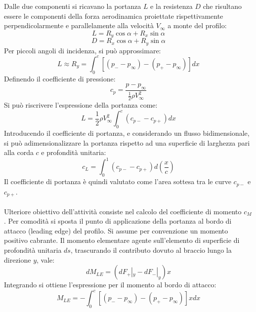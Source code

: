 Dalle due componenti si ricavano la portanza $L$ e la resistenza $D$ che risultano essere le componenti della forza aerodinamica proiettate rispettivamente perpendicolarmente e parallelamente alla velocità $V_\infty$ a monte del profilo:
\begin{equation*}
    L = R_y \cos \alpha + R_x \sin \alpha
\end{equation*}
\begin{equation*}
    D = R_x \cos \alpha + R_y \sin \alpha
\end{equation*}
Per piccoli angoli di incidenza, si può approssimare:
\begin{equation*}
    L\approx R_y = \int_0^c \left[ (p_--p_\infty) - (p_+-p_\infty) \right] dx
\end{equation*}
Definendo il coefficiente di pressione:
\begin{equation*}
    c_p = \frac{p-p_\infty}{\frac12 \rho V_\infty^2}
\end{equation*}
Si può riscrivere l'espressione della portanza come:
\begin{equation*}
    L = \frac12 \rho V^2_\infty \int_0^c (c_{p-}-c_{p+})dx
\end{equation*}
Introducendo il coefficiente di portanza, e considerando un flusso bidimensionale, si può adimensionalizzare la portanza rispetto ad una superficie di larghezza pari alla corda $c$ e profondità unitaria:
\begin{equation*}
    c_L = \int_0^1(c_{p-}-c_{p+})d\left( \frac xc \right)
\end{equation*}
Il coefficiente di portanza è quindi valutato come l'area sottesa tra le curve $c_{p-}$ e $c_{p+}$.\\\\
Ulteriore obiettivo dell'attività consiste nel calcolo del coefficiente di momento $c_M$. Per comodità si sposta il punto di applicazione della portanza al bordo di attacco (leading edge) del profilo. Si assume per convenzione un momento positivo cabrante. Il momento elementare agente sull'elemento di superficie di profondità unitaria $ds$, trascurando il contributo dovuto al braccio lungo la direzione $y$, vale:
\begin{equation*}
    dM_{LE} = (dF_+|_y - dF_-|_y) x
\end{equation*}
Integrando si ottiene l'espressione per il momento al bordo di attacco:
\begin{equation*}
    M_{LE} = -\int_0^c \left[ (p_- - p_\infty)- (p_+ - p_\infty) \right] xdx
\end{equation*}
